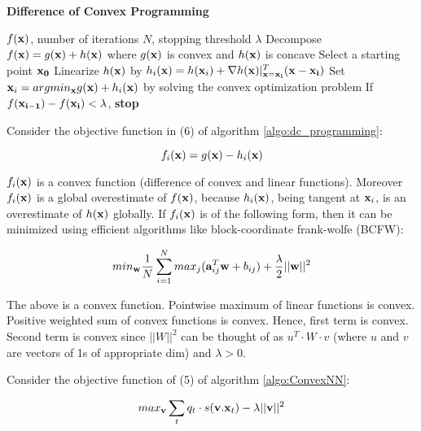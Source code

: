 \documentclass{article}
\begin{document}
\begin{algorithm}
\caption{{\bf Difference of Convex Programming}}\label{algo:dc_programming}
\begin{algorithmic}[1]
 $f({\bf x})$, number of iterations $N$, stopping threshold $\lambda$
\STATE Decompose $f({\bf x}) = g({\bf x}) + h({\bf x})$ where $g({\bf x})$ is convex and $h({\bf x})$ is concave
\STATE Select a starting point $\bf x_0$ 
\STATE Linearize $h({\bf x})$ by $h_i({\bf x})= h({\bf x}_i) + \nabla h({\bf x})|_{\bf x = x_i}^T ({\bf x} - {\bf x_i})$
\STATE Set ${\bf x}_i = argmin_{{\bf x}} g({\bf x}) + h_i({\bf x})$ by solving the convex optimization problem
\STATE If $f({\bf x_{i - 1}}) - f({\bf x_i}) < \lambda$, {\bf stop}
\ENDFOR
\end{algorithmic}
\end{algorithm}

Consider the objective function in (6) of algorithm \ref{algo:dc_programming}:

\begin{equation}
f_i({\bf x}) = g({\bf x}) - h_i({\bf x})
\end{equation}

$f_i({\bf x})$ is a convex function (difference of convex and linear functions). Moreover $f_i({\bf x})$ is a global overestimate of $f({\bf x})$, because $h_i({\bf x})$, being tangent at ${\bf x}_i$, is an overestimate of $h({\bf x})$ globally. If $f_i({\bf x})$ is of the following form, then it can be minimized using efficient algorithms like block-coordinate frank-wolfe (BCFW):

\begin{equation}
min_{\bf w} \frac{1}{N} \sum_{i = 1}^{N} max_j ({\bf a}_{ij}^T{\bf w} + b_{ij}) + \frac{\lambda}{2} ||{\bf w}||^2
\end{equation}

The above is a convex function. Pointwise maximum of linear functions is convex. Positive weighted sum of convex functions is convex. Hence, first term is convex. Second term is convex since $||W||^2$ can be thought of as $u^T \cdot W \cdot v$ (where $u$ and $v$ are vectors of 1s of appropriate dim) and $\lambda > 0$.

Consider the objective function of (5) of algorithm \ref{algo:ConvexNN}:

\begin{equation}
max_{{\bf v}} \sum_{t} q_t \cdot s({\bf v}.{\bf x}_t) - \lambda ||{\bf v}||^2
\end{equation}
\end{document}
